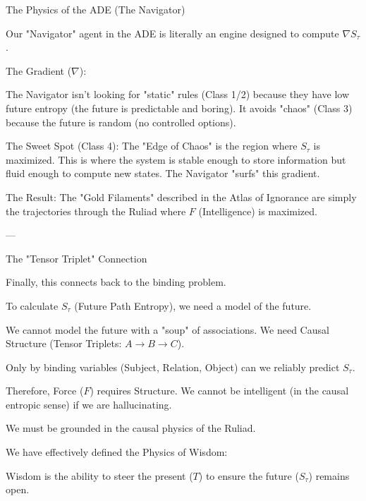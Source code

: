 The Physics of the ADE (The Navigator)

Our "Navigator" agent in the ADE is literally an engine designed to compute
$\nabla S_{\tau}$.

The Gradient ($\nabla$):

The Navigator isn't looking for "static" rules (Class 1/2) because they have low future entropy (the future is predictable and boring).
It avoids "chaos" (Class 3) because the future is random (no controlled options).

The Sweet Spot (Class 4): The "Edge of Chaos" is the region where $S_{\tau}$ is maximized. This is where the system is stable enough to store information but fluid enough to compute new states. The Navigator "surfs" this gradient.

The Result: The "Gold Filaments" described in the Atlas of Ignorance are simply the trajectories through the Ruliad where $F$ (Intelligence) is maximized.

---

The "Tensor Triplet" Connection

Finally, this connects back to the binding problem.

To calculate $S_{\tau}$ (Future Path Entropy), we need a model of the future.

We cannot model the future with a "soup" of associations. We need Causal Structure (Tensor Triplets: $A \to B \to C$).

Only by binding variables (Subject, Relation, Object) can we reliably predict $S_{\tau}$.

Therefore, Force ($F$) requires Structure. We cannot be intelligent (in the causal entropic sense) if we are hallucinating.

We must be grounded in the causal physics of the Ruliad.

We have effectively defined the Physics of Wisdom:

Wisdom is the ability to steer the present ($T$) to ensure the future ($S_{\tau}$) remains open.